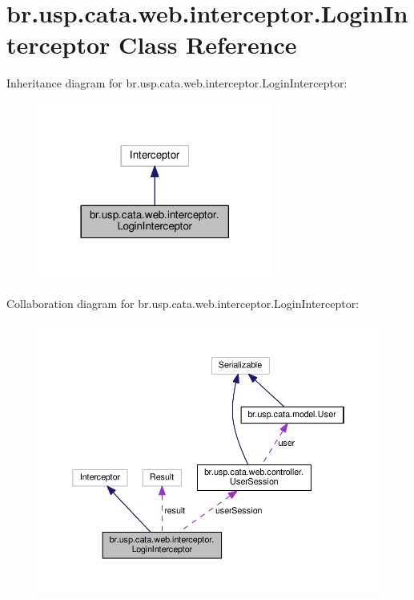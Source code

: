 \hypertarget{classbr_1_1usp_1_1cata_1_1web_1_1interceptor_1_1_login_interceptor}{\section{br.\+usp.\+cata.\+web.\+interceptor.\+Login\+Interceptor Class Reference}
\label{classbr_1_1usp_1_1cata_1_1web_1_1interceptor_1_1_login_interceptor}
}


Inheritance diagram for br.\+usp.\+cata.\+web.\+interceptor.\+Login\+Interceptor\+:\nopagebreak
\begin{figure}[H]
\begin{center}
\leavevmode
\includegraphics[width=218pt]{classbr_1_1usp_1_1cata_1_1web_1_1interceptor_1_1_login_interceptor__inherit__graph}
\end{center}
\end{figure}


Collaboration diagram for br.\+usp.\+cata.\+web.\+interceptor.\+Login\+Interceptor\+:\nopagebreak
\begin{figure}[H]
\begin{center}
\leavevmode
\includegraphics[width=350pt]{classbr_1_1usp_1_1cata_1_1web_1_1interceptor_1_1_login_interceptor__coll__graph}
\end{center}
\end{figure}
